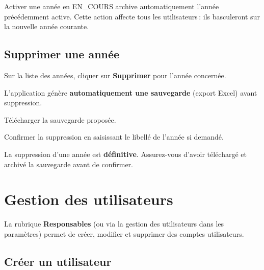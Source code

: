 \begin{warnbox}
  Activer une ann\'ee en EN\_COURS archive automatiquement l'ann\'ee pr\'ec\'edemment active. Cette action affecte tous les utilisateurs\,: ils basculeront sur la nouvelle ann\'ee courante.
\end{warnbox}

\subsection{Supprimer une ann\'ee}

\begin{steps}
  \item Sur la liste des ann\'ees, cliquer sur \textbf{Supprimer} pour l'ann\'ee concern\'ee.
  \item L'application g\'en\`ere \textbf{automatiquement une sauvegarde} (export Excel) avant suppression.
  \item T\'el\'echarger la sauvegarde propos\'ee.
  \item Confirmer la suppression en saisissant le libell\'e de l'ann\'ee si demand\'e.
\end{steps}

\begin{warnbox}
  La suppression d'une ann\'ee est \textbf{d\'efinitive}. Assurez-vous d'avoir t\'el\'echarg\'e et archiv\'e la sauvegarde avant de confirmer.
\end{warnbox}

\section{Gestion des utilisateurs}

La rubrique \textbf{Responsables} (ou via la gestion des utilisateurs dans les param\`etres) permet de cr\'eer, modifier et supprimer des comptes utilisateurs.


\subsection{Cr\'eer un utilisateur}

